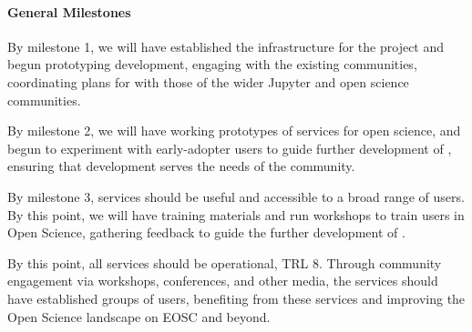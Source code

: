 


\paragraph{General Milestones}

\begin{milestones}
  {
  By milestone 1, we will have established the infrastructure
  for the project and begun prototyping development,
  engaging with the existing communities,
  coordinating plans for \TheProject with those of the wider Jupyter and open science communities.
  }

  {
  By milestone 2, we will have working prototypes of services
  for open science, and begun to experiment with early-adopter
  users to guide further development of \TheProject,
  ensuring that development serves the needs of the community.
  }

  {
  By milestone 3, services should be useful and accessible
  to a broad range of users.
  By this point, we will have training materials and run
  workshops to train users in Open Science,
  gathering feedback to guide the further development of \TheProject.
  }


  {
  By this point, all \TheProject services should be operational, TRL 8.
  Through community engagement via workshops, conferences, and other media,
  the services should have established groups of users,
  benefiting from these services and improving the Open Science landscape
  on EOSC and beyond.
  }

\end{milestones}

